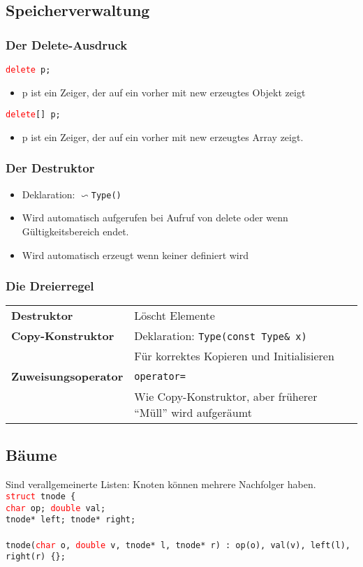\documentclass[a3paper, 10pt, landscape]{scrartcl}
\newcommand{\code}[1]{\texttt{#1}}
\begin{document}
\begin{multicols*}{3}
	
	\subsection{Speicherverwaltung}
	
	\subsubsection{Der Delete-Ausdruck}
	\code{\textcolor{red}{delete} p;}
	\begin{itemize}
		\item p ist ein Zeiger, der auf ein vorher mit new erzeugtes Objekt zeigt
	\end{itemize}
	\code{\textcolor{red}{delete}[] p;}
	\begin{itemize}
		\item p ist ein Zeiger, der auf ein vorher mit new erzeugtes Array zeigt.
	\end{itemize}
	
	\subsubsection{Der Destruktor}
	\begin{itemize}
		\item Deklaration: \code{$\backsim$Type()}
		\item Wird automatisch aufgerufen bei Aufruf von delete oder wenn Gültigkeitsbereich endet.
		\item Wird automatisch erzeugt wenn keiner definiert wird
	\end{itemize}
	
	\subsubsection{Die Dreierregel}
	\begin{tabular}{l l}
		\textbf{Destruktor} & Löscht Elemente \\
		\textbf{Copy-Konstruktor} & Deklaration: \code{Type(const Type\& x)}\\
		& Für korrektes Kopieren und Initialisieren\\
		\textbf{Zuweisungsoperator} & \code{operator=} \\
		& Wie Copy-Konstruktor, aber früherer "`Müll"' wird aufgeräumt\\
	\end{tabular}
	
	\subsection{Bäume}
	Sind verallgemeinerte Listen: Knoten können mehrere Nachfolger haben.\\
	\code{\textcolor{red}{struct} tnode \{ \\
	\phantom{struct }\textcolor{red}{char} op; \textcolor{red}{double} val; \\
	\phantom{struct }tnode* left; tnode* right;\\
	\\
	tnode(\textcolor{red}{char} o, \textcolor{red}{double} v, tnode* l, tnode* r) : op(o), val(v), left(l), right(r) \{\};
	}
	

\end{multicols*}
\end{document}
